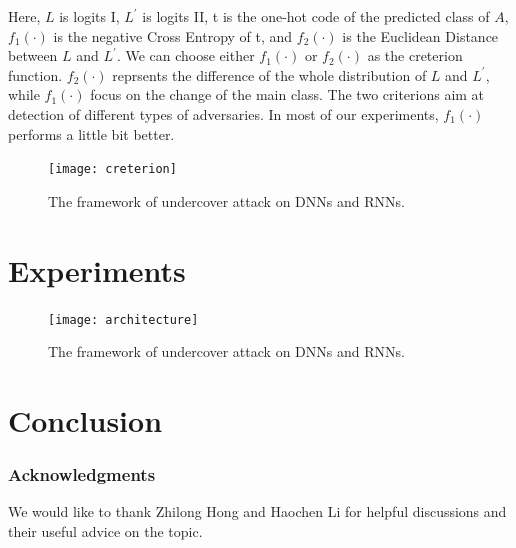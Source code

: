\documentclass{article}
\begin{document}
Here, $L$ is logits I, $L^{'}$ is logits II, t is the one-hot code of the predicted class of $A$, $f_1(\cdot)$ is the negative Cross Entropy of t, and $f_2(\cdot)$ is the Euclidean Distance between $L$ and $L^{'}$. We can choose either $f_1(\cdot)$ or $f_2(\cdot)$ as the creterion function. $f_2(\cdot)$ reprsents the difference of the whole distribution of $L$ and $L^{'}$, while $f_1(\cdot)$ focus on the change of the main class. The two criterions aim at detection of different types of adversaries. In most of our experiments, $f_1(\cdot)$ performs a little bit better.

\begin{figure}[ht]
  \centerline{\texttt{[image: creterion]}}
  \caption{The framework of undercover attack on DNNs and RNNs.}
  \label{creterion}
\end{figure}

\section{Experiments}

\begin{figure}[ht]
  \centerline{\texttt{[image: architecture]}}
  \caption{The framework of undercover attack on DNNs and RNNs.}
  \label{framework}
\end{figure}




\section{Conclusion}














\subsubsection*{Acknowledgments}

We would like to thank Zhilong Hong and Haochen Li for helpful discussions and their useful advice on the topic. %

\small


\end{document}
